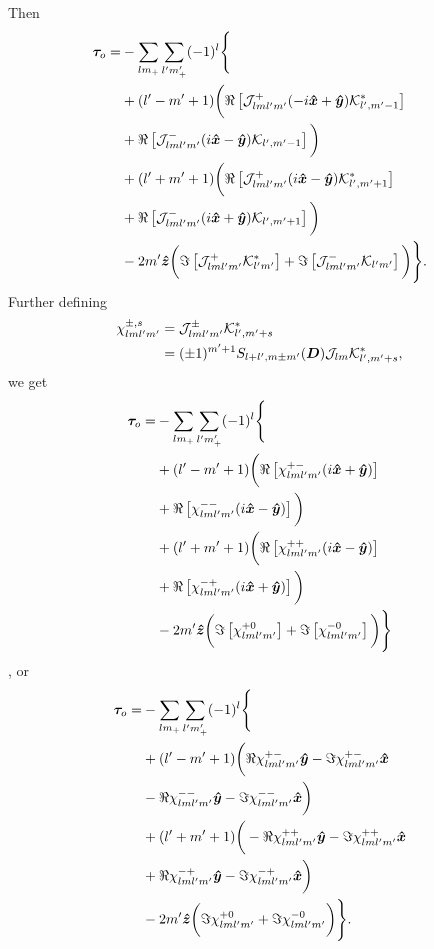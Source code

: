 \documentclass[aps,twocolumn,secnumarabic,balancelastpage,amsmath,amssymb,nofootinbib,floatfix]{revtex4-1}
\begin{document}
Then
\begin{equation*}
\begin{aligned}
\bm \tau_o = &-\sum_{lm_+}\sum_{l'm'_+}(-1)^l\Bigg\{\\
&+(l'-m'+1)\bigg(\Re\left[ \mathcal{J}_{lml'm'}^+(-i\bm{\hat x}+\bm{\hat y})\mathcal{K}^*_{l',m'-1} \right]\\
&+\Re\left[ \mathcal{J}_{lml'm'}^-(i\bm{\hat x}-\bm{\hat y})\mathcal{K}_{l',m'-1} \right]\bigg)\\
&+(l'+m'+1)\bigg(\Re\left[ \mathcal{J}_{lml'm'}^+(i\bm{\hat x}-\bm{\hat y})\mathcal{K}^*_{l',m'+1} \right]\\
&+\Re\left[ \mathcal{J}_{lml'm'}^-(i\bm{\hat x} + \bm{\hat y})\mathcal{K}_{l',m'+1} \right]\bigg)\\
&-2m'\bm{\hat z}\bigg(\Im\left[ \mathcal{J}_{lml'm'}^+\mathcal{K}^*_{l'm'} \right]+\Im\left[ \mathcal{J}_{lml'm'}^-\mathcal{K}_{l'm'} \right]\bigg)\Bigg\}.
\end{aligned}
\end{equation*}
Further defining
\begin{equation}
\begin{aligned}
\chi_{lml'm'}^{\pm,s}& = \mathcal{J}_{lml'm'}^\pm \mathcal{K}^*_{l',m'+s}\\
&= (\pm 1)^{m'+1}S_{l+l',m\pm m'}(\bm D)\mathcal{J}_{lm} \mathcal{K}^*_{l',m'+s},
\end{aligned}
\label{eqn:chi}
\end{equation}
we get
\begin{equation*}
\begin{aligned}
\bm \tau_o = &-\sum_{lm_+}\sum_{l'm'_+}(-1)^l\Bigg\{\\
&+(l'-m'+1)\bigg(\Re\left[ \chi_{lml'm'}^{+-}(i\bm{\hat x}+\bm{\hat y}) \right]\\
&+\Re\left[ \chi_{lml'm'}^{--}(i\bm{\hat x}-\bm{\hat y}) \right]\bigg)\\
&+(l'+m'+1)\bigg(\Re\left[ \chi_{lml'm'}^{++}(i\bm{\hat x}-\bm{\hat y}) \right]\\
&+\Re\left[ \chi_{lml'm'}^{-+}(i\bm{\hat x} + \bm{\hat y}) \right]\bigg)\\
&-2m'\bm{\hat z}\bigg(\Im\left[ \chi_{lml'm'}^{+0} \right]+\Im\left[ \chi_{lml'm'}^{-0} \right]\bigg)\Bigg\}
\end{aligned}
\end{equation*}
, or
\begin{equation*}
\begin{aligned}
\bm \tau_o = &-\sum_{lm_+}\sum_{l'm'_+}(-1)^l\Bigg\{\\
&+(l'-m'+1)\bigg(\Re\chi_{lml'm'}^{+-}\bm{\hat y} - \Im\chi_{lml'm'}^{+-}\bm{\hat x}\\
&-\Re\chi_{lml'm'}^{--}\bm{\hat y} - \Im\chi_{lml'm'}^{--}\bm{\hat x} \bigg)\\
&+(l'+m'+1)\bigg(-\Re\chi_{lml'm'}^{++}\bm{\hat y} - \Im\chi_{lml'm'}^{++}\bm{\hat x}\\
&+\Re\chi_{lml'm'}^{-+}\bm{\hat y} - \Im\chi_{lml'm'}^{-+}\bm{\hat x}\bigg)\\
&-2m'\bm{\hat z}\bigg(\Im\chi_{lml'm'}^{+0}+\Im\chi_{lml'm'}^{-0}\bigg)\Bigg\}.
\end{aligned}
\end{equation*}
\end{document}
